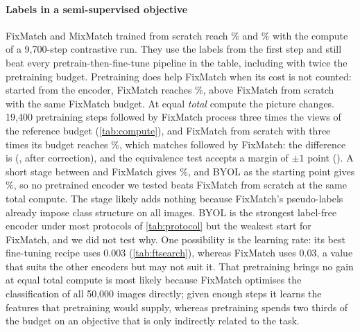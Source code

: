 \paragraph{Labels in a semi-supervised objective}
FixMatch and MixMatch trained from scratch reach \% and
\% with the compute of a 9,700-step contrastive run. They use the labels from the
first step and still beat every pretrain-then-fine-tune pipeline in the table, including \simclr with
twice the pretraining budget. Pretraining does help FixMatch when its cost is not counted: started from the
\simclr encoder, FixMatch reaches \%, \pt above FixMatch from
scratch with the same FixMatch budget. At equal \emph{total} compute the picture changes. 19,400 pretraining
steps followed by FixMatch process three times the views of the reference budget (\cref{tab:compute}), and
FixMatch from scratch with three times its budget reaches \%, which matches \simclr
followed by FixMatch: the difference is \pt (,
 after correction), and the equivalence test accepts a margin of $\pm1$ point
(). A short
\supcon stage between \simclr and FixMatch gives \%, and BYOL as the
starting point gives \%, so no pretrained encoder we tested beats FixMatch from
scratch at the same total compute. The \supcon stage likely adds nothing because FixMatch's pseudo-labels
already impose class structure on all images. BYOL is the strongest label-free encoder under most protocols of
\cref{tab:protocol} but the weakest start for FixMatch, and we did not test why. One possibility is the learning
rate: its best fine-tuning recipe uses 0.003 (\cref{tab:ftsearch}), whereas FixMatch uses 0.03, a value that
suits the other encoders but may not suit it. That pretraining brings no gain at equal total compute is most likely because
FixMatch optimises the classification of all 50,000 images directly; given enough steps it learns the
features that pretraining would supply, whereas pretraining spends two thirds of the budget on an objective
that is only indirectly related to the task.

